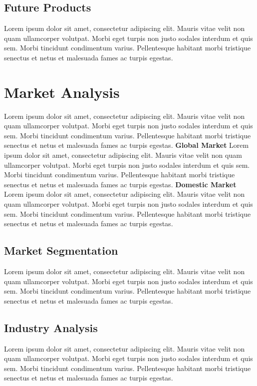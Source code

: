 \documentclass[11pt,titlepage]{article}
\begin{document}
\subsection{Future Products}
Lorem ipsum dolor sit amet, consectetur adipiscing elit. Mauris vitae velit 
non quam ullamcorper volutpat. Morbi eget turpis non justo sodales interdum 
et quis sem. Morbi tincidunt condimentum varius. Pellentesque habitant morbi 
tristique senectus et netus et malesuada fames ac turpis egestas.\newline
\pagebreak

\section{Market Analysis}
Lorem ipsum dolor sit amet, consectetur adipiscing elit. Mauris vitae velit 
non quam ullamcorper volutpat. Morbi eget turpis non justo sodales interdum 
et quis sem. Morbi tincidunt condimentum varius. Pellentesque habitant morbi 
tristique senectus et netus et malesuada fames ac turpis egestas.\newline
\textbf{Global Market}\newline
Lorem ipsum dolor sit amet, consectetur adipiscing elit. Mauris vitae velit 
non quam ullamcorper volutpat. Morbi eget turpis non justo sodales interdum 
et quis sem. Morbi tincidunt condimentum varius. Pellentesque habitant morbi 
tristique senectus et netus et malesuada fames ac turpis egestas.\newline
\textbf{Domestic Market}\newline
Lorem ipsum dolor sit amet, consectetur adipiscing elit. Mauris vitae velit 
non quam ullamcorper volutpat. Morbi eget turpis non justo sodales interdum 
et quis sem. Morbi tincidunt condimentum varius. Pellentesque habitant morbi 
tristique senectus et netus et malesuada fames ac turpis egestas.\newline
\subsection{Market Segmentation}
Lorem ipsum dolor sit amet, consectetur adipiscing elit. Mauris vitae velit 
non quam ullamcorper volutpat. Morbi eget turpis non justo sodales interdum 
et quis sem. Morbi tincidunt condimentum varius. Pellentesque habitant morbi 
tristique senectus et netus et malesuada fames ac turpis egestas.\newline
\subsection{Industry Analysis}
Lorem ipsum dolor sit amet, consectetur adipiscing elit. Mauris vitae velit 
non quam ullamcorper volutpat. Morbi eget turpis non justo sodales interdum 
et quis sem. Morbi tincidunt condimentum varius. Pellentesque habitant morbi 
tristique senectus et netus et malesuada fames ac turpis egestas.\newline
\hypertarget{competition_and_buying_patterns}{}
\end{document}
